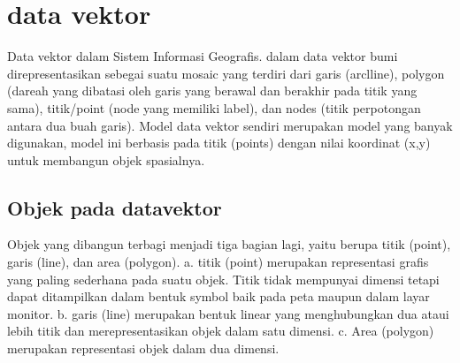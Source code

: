 


\section{data vektor}
  Data vektor dalam Sistem Informasi Geografis. dalam  data vektor bumi direpresentasikan sebegai suatu  mosaic yang terdiri dari garis (arclline), polygon (dareah yang dibatasi oleh garis yang berawal dan berakhir pada titik yang sama), titik/point (node yang memiliki label),  dan nodes (titik perpotongan antara dua buah garis). Model data vektor sendiri merupakan model yang banyak digunakan, model ini berbasis pada titik (points) dengan nilai koordinat (x,y) untuk membangun objek spasialnya. 

\subsection {Objek pada datavektor}
Objek yang dibangun terbagi menjadi tiga bagian lagi, yaitu berupa titik (point), garis (line), dan area (polygon). 
a. titik (point) merupakan representasi grafis yang paling sederhana pada suatu objek. Titik tidak mempunyai dimensi tetapi dapat ditampilkan dalam bentuk symbol baik pada peta maupun dalam layar monitor.
b. garis (line) merupakan bentuk linear yang menghubungkan dua ataui lebih titik dan merepresentasikan objek dalam satu dimensi. 
c. Area (polygon) merupakan representasi objek dalam dua dimensi.
